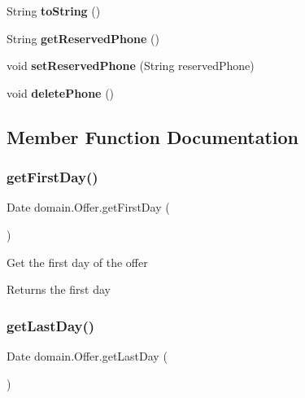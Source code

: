 \begin{DoxyCompactItemize}
String {\bfseries to\+String} ()
\item 
\mbox{\label{classdomain_1_1_offer_ac7962273d54b3a99a40ce86c4ce53289}} 
String {\bfseries get\+Reserved\+Phone} ()
\item 
\mbox{\label{classdomain_1_1_offer_ac79a4a4efc643fb5bd0e8a423c96dde4}} 
void {\bfseries set\+Reserved\+Phone} (String reserved\+Phone)
\item 
\mbox{\label{classdomain_1_1_offer_a5eed495d6abcc8635d4e702cf39779c7}} 
void {\bfseries delete\+Phone} ()
\end{DoxyCompactItemize}


\subsection{Member Function Documentation}
\mbox{\label{classdomain_1_1_offer_ae13ac55ba469cb34e004d6aff68430fb}} 
\subsubsection{\texorpdfstring{getFirstDay()}{getFirstDay()}}
{\footnotesize\ttfamily Date domain.\+Offer.\+get\+First\+Day (\begin{DoxyParamCaption}{ }\end{DoxyParamCaption})}

Get the first day of the offer

\begin{DoxyReturn}{Returns}
the first day 
\end{DoxyReturn}
\mbox{\label{classdomain_1_1_offer_a8bf48365a8fc185dbdcaac80a9d84444}} 
\subsubsection{\texorpdfstring{getLastDay()}{getLastDay()}}
{\footnotesize\ttfamily Date domain.\+Offer.\+get\+Last\+Day (\begin{DoxyParamCaption}{ }\end{DoxyParamCaption})}

